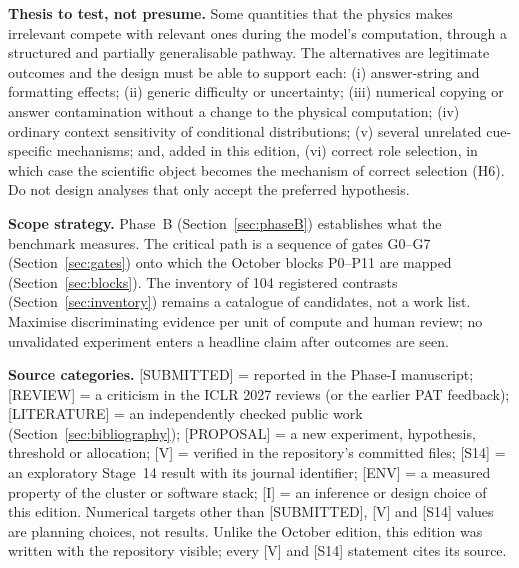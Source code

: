 \documentclass[10pt,a4paper]{article}
\newcommand{\tg}[1]{\textsc{[#1]}}
\begin{document}
\textbf{Thesis to test, not presume.} Some quantities that the physics makes irrelevant compete with relevant ones
during the model's computation, through a structured and partially generalisable pathway. The alternatives are
legitimate outcomes and the design must be able to support each: (i) answer-string and formatting effects;
(ii) generic difficulty or uncertainty; (iii) numerical copying or answer contamination without a change to the
physical computation; (iv) ordinary context sensitivity of conditional distributions; (v) several unrelated
cue-specific mechanisms; and, added in this edition, (vi) correct role selection, in which case the scientific
object becomes the mechanism of correct selection (H6). Do not design analyses that only accept the preferred
hypothesis.

\textbf{Scope strategy.} Phase~B (Section~\ref{sec:phaseB}) establishes what the benchmark measures. The critical
path is a sequence of gates G0--G7 (Section~\ref{sec:gates}) onto which the October blocks P0--P11 are mapped
(Section~\ref{sec:blocks}). The inventory of 104 registered contrasts (Section~\ref{sec:inventory}) remains a
catalogue of candidates, not a work list. Maximise discriminating evidence per unit of compute and human review;
no unvalidated experiment enters a headline claim after outcomes are seen.

\textbf{Source categories.} \tg{SUBMITTED} = reported in the Phase-I manuscript; \tg{REVIEW} = a criticism in the
ICLR 2027 reviews (or the earlier PAT feedback); \tg{LITERATURE} = an independently checked public work
(Section~\ref{sec:bibliography}); \tg{PROPOSAL} = a new experiment, hypothesis, threshold or allocation;
\tg{V} = verified in the repository's committed files; \tg{S14} = an exploratory Stage~14 result with its journal
identifier; \tg{ENV} = a measured property of the cluster or software stack; \tg{I} = an inference or design choice
of this edition. Numerical targets other than \tg{SUBMITTED}, \tg{V} and \tg{S14} values are planning choices, not
results. Unlike the October edition, this edition was written with the repository visible; every \tg{V} and
\tg{S14} statement cites its source.
\end{document}
